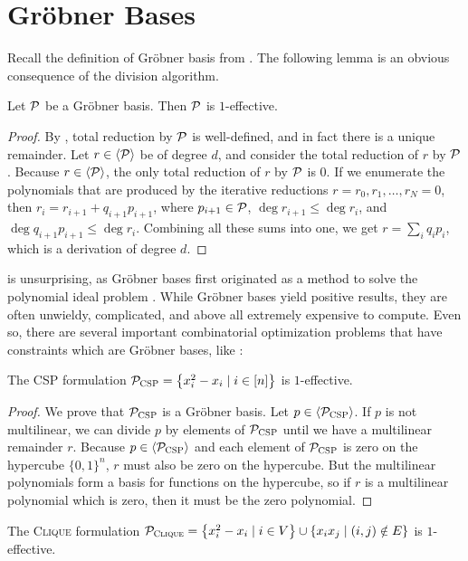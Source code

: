 \section{Gr\"obner Bases}
Recall the definition of Gr\"obner basis from . The following lemma is an obvious consequence of the division algorithm.
\begin{lemma}\label{lem:grobnereffective}
Let $\mathcal P$ be a Gr\"obner basis. Then $\mathcal P$ is $1$-effective.
\end{lemma}
\begin{proof}
By , total reduction by $\mathcal P$ is well-defined, and in fact there is a unique 
remainder. Let $r \in \langle \mathcal P \rangle$ be of degree $d$, and consider the total reduction of $r$ by $\mathcal P$. Because $r \in \langle \mathcal P \rangle$, the only total reduction of $r$ by $\mathcal P$ is $0$. If we enumerate the polynomials that are produced by the iterative reductions $r = r_0, r_1, \dots, r_N = 0$, then 
$r_i = r_{i+1} + q_{i+1}p_{i+1}$, where $p_{i+1} \in \mathcal P$, $\deg r_{i+1} \leq \deg r_i$, and $\deg q_{i+1}p_{i+1} \leq \deg r_i$. Combining all these sums into one, we get
$r = \sum_i q_i p_i$, which is a derivation of degree $d$. 
\end{proof}
 is unsurprising, as Gr\"obner bases first originated as a method to solve the polynomial ideal problem \cite{Buch65}. 
While Gr\"obner bases yield positive results, they are often unwieldy, complicated, and above all extremely expensive to compute. 
Even so, there are several important combinatorial optimization problems that have constraints which are Gr\"obner bases, like :
\begin{corollary}\label{cor:csp-effective}
The \textsc{CSP} formulation $\mathcal P_{\textsc{CSP}} = \left\{x_i^2 - x_i \mid i \in [n]\right\}$ is $1$-effective.
\end{corollary}
\begin{proof}
We prove that $\mathcal P_{\textsc{CSP}}$ is a Gr\"obner basis. 
Let $p \in \langle \mathcal P_{\textsc{CSP}} \rangle$. If $p$ is not multilinear, we can divide $p$ by elements of $\mathcal P_{\textsc{CSP}}$ until we have a multilinear remainder $r$. Because 
$p \in \langle \mathcal P_{\textsc{CSP}} \rangle$ and each element of $\mathcal P_{\textsc{CSP}}$ is zero on the hypercube $\{0, 1\}^n$, $r$ must also be zero on the hypercube. But the multilinear
polynomials form a basis for functions on the hypercube, so if $r$ is a multilinear polynomial which is zero, then it must be the zero polynomial. 
\end{proof}
\begin{corollary}
The \textsc{Clique} formulation $\mathcal P_{\textsc{Clique}} = \left\{x_i^2 - x_i \mid i \in V\right\} \cup \left\{x_ix_j \mid (i,j) \notin E\right\}$ is $1$-effective.
\end{corollary}
